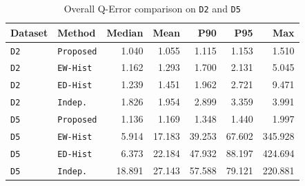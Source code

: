 \begin{table}[htbp]
    \centering
    \caption{Overall Q-Error comparison on \texttt{D2} and \texttt{D5}}
    \label{tab:overall_qerror_comparison}
    \small
    \setlength{\tabcolsep}{3pt}
    \begin{tabular}{@{}llrrrrr@{}}
        \toprule
        Dataset & Method & Median & Mean & P90 & P95 & Max \\
        \midrule
        \texttt{D2} & \texttt{Proposed} & 1.040 & 1.055 & 1.115 & 1.153 & 1.510 \\
        \texttt{D2} & \texttt{EW-Hist} & 1.162 & 1.293 & 1.700 & 2.131 & 5.045 \\
        \texttt{D2} & \texttt{ED-Hist} & 1.239 & 1.451 & 1.962 & 2.721 & 9.471 \\
        \texttt{D2} & \texttt{Indep.} & 1.826 & 1.954 & 2.899 & 3.359 & 3.991 \\
        \midrule
        \texttt{D5} & \texttt{Proposed} & 1.136 & 1.169 & 1.348 & 1.440 & 1.997 \\
        \texttt{D5} & \texttt{EW-Hist} & 5.914 & 17.183 & 39.253 & 67.602 & 345.928 \\
        \texttt{D5} & \texttt{ED-Hist} & 6.373 & 22.184 & 47.932 & 88.197 & 424.694 \\
        \texttt{D5} & \texttt{Indep.} & 18.891 & 27.143 & 57.588 & 79.121 & 220.881 \\
        \bottomrule
    \end{tabular}
\end{table}
